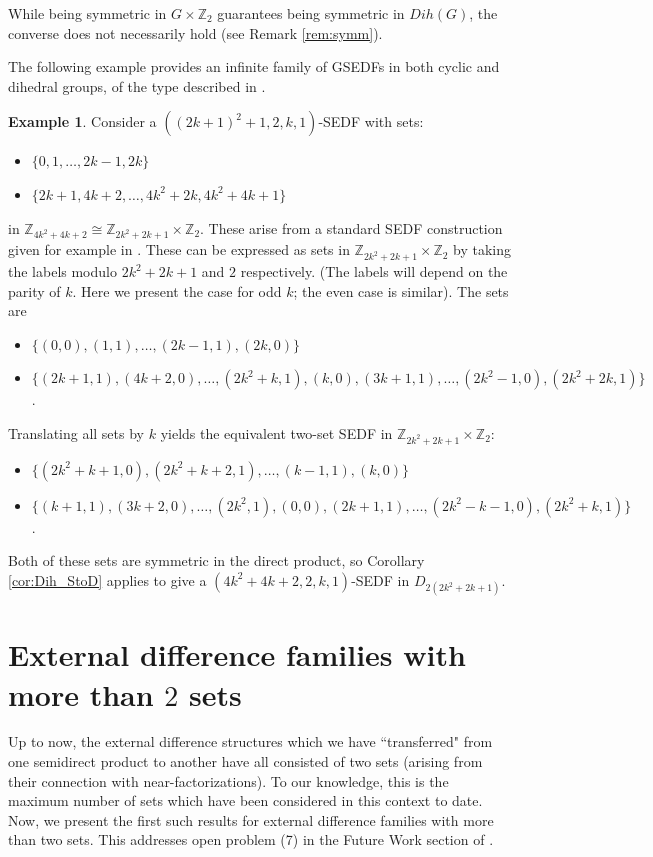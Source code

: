 \documentclass[12pt, a4paper]{article}
\theoremstyle{definition}
\newtheorem{example}[theorem]{Example}
\begin{document}
While being symmetric in $G \times \mathbb{Z}_2$ guarantees being symmetric in $Dih(G)$, the converse does not necessarily hold (see Remark \ref{rem:symm}).

The following example provides an infinite family of GSEDFs in both cyclic and dihedral groups, of the type described in \cite{KrePatSti}.  

\begin{example}\label{EDFPecExmp}
Consider a $((2k+1)^2+1,2,k,1)$-SEDF with sets:
\begin{itemize}
\item $\{0,1,\ldots,2k-1,2k\}$
\item $\{2k+1,4k+2,\ldots, 4k^2+2k,4k^2+4k+1\}$
\end{itemize}
in $\mathbb{Z}_{4k^2+4k+2} \cong \mathbb{Z}_{2k^2+2k+1}\times \mathbb{Z}_2$.
These arise from a standard SEDF construction given for example in \cite{PatSti}.
These can be expressed as sets in $\mathbb{Z}_{2k^2+2k+1}\times \mathbb{Z}_2$ by taking the labels modulo $2k^2+2k+1$ and $2$ respectively. (The labels will depend on the parity of $k$.  Here we present the case for odd $k$; the even case is similar).  The sets are
\begin{itemize}
\item $\{(0,0),(1,1),\ldots,(2k-1,1),(2k,0)\}$
\item $\{(2k+1,1),(4k+2,0),\ldots, (2k^2+k,1),(k,0),(3k+1,1),\ldots, (2k^2-1,0),(2k^2+2k,1)\}$.
\end{itemize}
Translating all sets by $k$ yields the equivalent two-set SEDF in $\mathbb{Z}_{2k^2+2k+1}\times \mathbb{Z}_2$:
\begin{itemize}
\item $\{(2k^2+k+1,0),(2k^2+k+2,1),\ldots,(k-1,1),(k,0)\}$
\item $\{(k+1,1),(3k+2,0),\ldots, (2k^2,1),(0,0),(2k+1,1),\ldots, (2k^2-k-1,0),(2k^2+k,1)\}$.
\end{itemize}
Both of these sets are symmetric in the direct product, so Corollary \ref{cor:Dih_StoD} applies to give a $(4k^2+4k+2,2,k,1)$-SEDF in $D_{2(2k^2+2k+1)}$.
\end{example}


\section{External difference families with more than $2$ sets}

Up to now, the external difference structures which we have ``transferred" from one semidirect product to another  have all consisted of two sets (arising from their connection with near-factorizations).  To our knowledge, this is the maximum number of sets which have been considered in this context to date.  Now, we present the first such results for external difference families with more than two sets.   This addresses open problem (7) in the Future Work section of \cite{Swa}.
\end{document}
